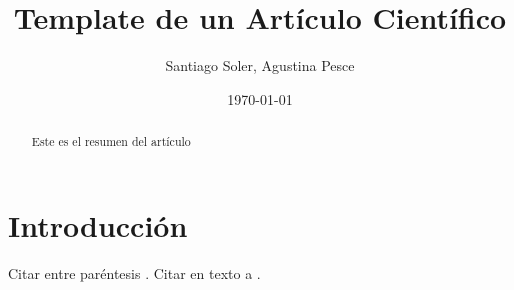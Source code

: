 \documentclass[a4paper]{article}
\title{Template de un Artículo Científico}
\author{Santiago Soler, Agustina Pesce}
\date{\today}
\begin{document}
\maketitle


\begin{abstract}
Este es el resumen del artículo
\end{abstract}



\section{Introducción}

Citar entre paréntesis \citep[e.g.][]{Tanaka1999}.
Citar en texto a \citet{Tanaka1999}.


\end{document}
